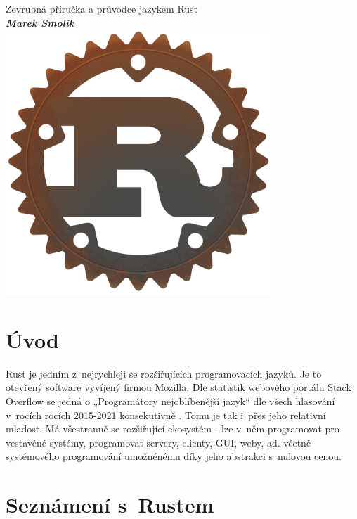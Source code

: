 \documentclass[a4paper, 12pt]{article} %
\begin{document}
\thispagestyle{empty}
\begin{center}
	{\LARGE Zevrubná příručka a průvodce jazykem Rust} \\ [1cm]
	\textbf{\textit{\Large Marek Smolík}} \\ [4cm]
	\includegraphics[width=10cm]{logo_alt.png}
\end{center}

\vfill

\newpage
\thispagestyle{empty}
\vspace*{\fill}

\tableofcontents

\newpage


\section*{Úvod}
	Rust je jedním z~nejrychleji se rozšiřujících programovacích jazyků. Je to otevřený software vyvíjený firmou Mozilla. Dle statistik webového portálu \href{https://stackoverflow.com/}{Stack Overflow} se jedná o  „Programátory nejoblíbenější jazyk“ dle všech hlasování v~rocích rocích 2015-2021 konsekutivně \cite{stack}. Tomu je tak i~přes jeho relativní mladost. Má všestranně se rozšiřující ekosystém - lze v~něm programovat pro vestavěné systémy, programovat servery, clienty, GUI, weby, ad. včetně systémového programování umožnénému díky jeho abstrakci s~nulovou cenou.


\section*{Seznámení s~Rustem}
\end{document}
